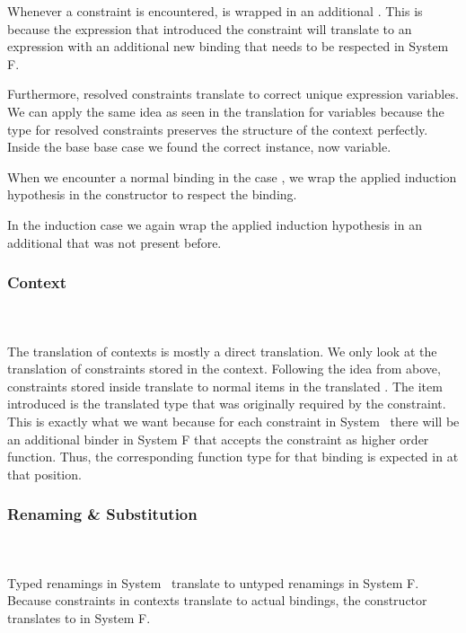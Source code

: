 \noindent Whenever a constraint is encountered,  is wrapped in an additional . 
This is because the expression that introduced the constraint will translate to an expression with an additional new binding that needs to be respected in System F.

\noindent Furthermore, resolved constraints translate to correct unique expression variables. We can apply the same idea as seen in the translation for variables because the type for resolved constraints \Data{[}  \Data{]∈}  preserves the structure of the context perfectly. 
\DPTOVar
Inside the base base case we found the correct instance, now variable.

\noindent When we encounter a normal binding in the case , we wrap the applied induction hypothesis in the  constructor to respect the binding.

\noindent In the induction case  we again wrap the applied induction hypothesis in an additional  that was not present before.
\subsubsection{Context}\hfill\\\\
The translation of contexts is mostly a direct translation. 
We only look at the translation of constraints stored in the context.
\DPTCtx
Following the idea from above, constraints  \Constr{:}  stored inside  translate to normal items in the translated . 
The item introduced is the translated type   that was originally required by the constraint. This is exactly what we want because for each constraint in System \Fo\ there will be an additional binder in System F that accepts the constraint as higher order function. 
Thus, the corresponding function type for that binding is expected in  at that position.

\subsubsection{Renaming \& Substitution}\hfill\\\\
Typed renamings in System \Fo\ translate to untyped renamings in System F.
\DPTRen
\noindent Because constraints in contexts translate to actual bindings, the constructor  translates to  in System F.

